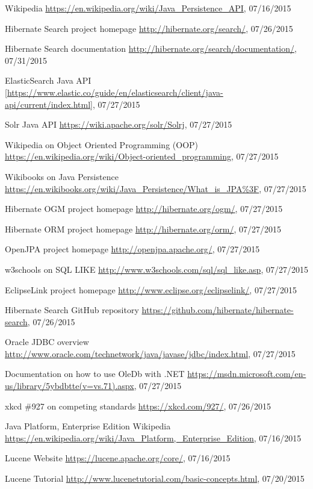 %
%
\begin{thebibliography}{99}
	Wikipedia
	\url{https://en.wikipedia.org/wiki/Java_Persistence_API}, 07/16/2015
	
	Hibernate Search project homepage
	\url{http://hibernate.org/search/}, 07/26/2015
	
	Hibernate Search documentation
	\url{http://hibernate.org/search/documentation/}, 07/31/2015
	
	ElasticSearch Java API
	\url{[https://www.elastic.co/guide/en/elasticsearch/client/java-api/current/index.html]}, 07/27/2015
	
	Solr Java API
	\url{https://wiki.apache.org/solr/Solrj}, 07/27/2015
	
	Wikipedia on Object Oriented Programming (OOP)
	\url{https://en.wikipedia.org/wiki/Object-oriented_programming}, 07/27/2015
	
	Wikibooks on Java Persistence
	\url{https://en.wikibooks.org/wiki/Java_Persistence/What_is_JPA\%3F}, 07/27/2015
	
	Hibernate OGM project homepage
	\url{http://hibernate.org/ogm/}, 07/27/2015
	
	Hibernate ORM project homepage
	\url{http://hibernate.org/orm/}, 07/27/2015
	
	OpenJPA project homepage
	\url{http://openjpa.apache.org/}, 07/27/2015
	
	w3schools on SQL LIKE
	\url{http://www.w3schools.com/sql/sql_like.asp}, 07/27/2015
	
	EclipseLink project homepage
	\url{http://www.eclipse.org/eclipselink/}, 07/27/2015
	
	Hibernate Search GitHub repository
	\url{https://github.com/hibernate/hibernate-search}, 07/26/2015
	
	Oracle JDBC overview
	\url{http://www.oracle.com/technetwork/java/javase/jdbc/index.html}, 07/27/2015
	
	Documentation on how to use OleDb with .NET
	\url{https://msdn.microsoft.com/en-us/library/5ybdbtte(v=vs.71).aspx}, 07/27/2015
	
	xkcd \#927 on competing standards
	\url{https://xkcd.com/927/}, 07/26/2015
	
	Java Platform, Enterprise Edition
	Wikipedia
	\url{https://en.wikipedia.org/wiki/Java_Platform,_Enterprise_Edition}, 07/16/2015
	
	Lucene Website
	\url{https://lucene.apache.org/core/}, 07/16/2015
	
	Lucene Tutorial
	\url{http://www.lucenetutorial.com/basic-concepts.html}, 07/20/2015
	
	
\end{thebibliography}